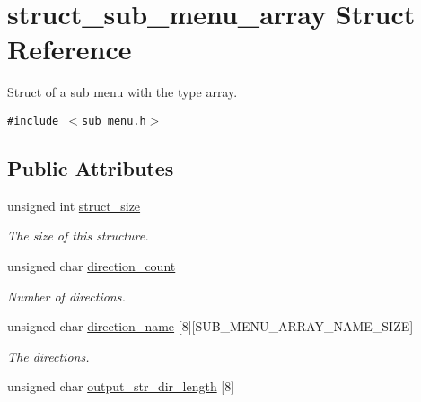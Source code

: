 \hypertarget{structstruct__sub__menu__array}{
\section{struct\_\-sub\_\-menu\_\-array Struct Reference}
\label{structstruct__sub__menu__array}
}
Struct of a sub menu with the type array.  


{\tt \#include $<$sub\_\-menu.h$>$}

\subsection*{Public Attributes}
\begin{CompactItemize}
\item 
\hypertarget{structstruct__sub__menu__array_8975b7b595bbf5fdcc5ead85b3da49ca}{
unsigned int \hyperlink{structstruct__sub__menu__array_8975b7b595bbf5fdcc5ead85b3da49ca}{struct\_\-size}}
\label{structstruct__sub__menu__array_8975b7b595bbf5fdcc5ead85b3da49ca}

\begin{CompactList}\small\item\em The size of this structure. \item\end{CompactList}\item 
\hypertarget{structstruct__sub__menu__array_d1fcf11a40fda68f1b0d93e14f18a10c}{
unsigned char \hyperlink{structstruct__sub__menu__array_d1fcf11a40fda68f1b0d93e14f18a10c}{direction\_\-count}}
\label{structstruct__sub__menu__array_d1fcf11a40fda68f1b0d93e14f18a10c}

\begin{CompactList}\small\item\em Number of directions. \item\end{CompactList}\item 
\hypertarget{structstruct__sub__menu__array_adf750deff677534e54e294fc8b55381}{
unsigned char \hyperlink{structstruct__sub__menu__array_adf750deff677534e54e294fc8b55381}{direction\_\-name} \mbox{[}8\mbox{]}\mbox{[}SUB\_\-MENU\_\-ARRAY\_\-NAME\_\-SIZE\mbox{]}}
\label{structstruct__sub__menu__array_adf750deff677534e54e294fc8b55381}

\begin{CompactList}\small\item\em The directions. \item\end{CompactList}\item 
\hypertarget{structstruct__sub__menu__array_06ad1fe923e65b2141b055fdb5686f3e}{
unsigned char \hyperlink{structstruct__sub__menu__array_06ad1fe923e65b2141b055fdb5686f3e}{output\_\-str\_\-dir\_\-length} \mbox{[}8\mbox{]}}
\label{structstruct__sub__menu__array_06ad1fe923e65b2141b055fdb5686f3e}


\end{CompactItemize}
